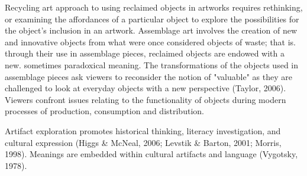 Recycling art approach to using reclaimed objects in artworks requires rethinking, or examining the affordances of a particular object to explore the possibilities for the object's inclusion in an artwork. Assemblage art involves the creation of new and innovative objects from what were once considered objects of waste; that is. through their use in assemblage pieces, reclaimed objects are endowed with a new. sometimes paradoxical meaning. The transformations of the objects used in assemblage pieces ask viewers to reconsider the notion of "valuable" as they are challenged to look at everyday objects with a new perspective (Taylor, 2006). Viewers confront issues relating to the functionality of objects during modern processes of production, consumption and distribution.

Artifact exploration promotes historical thinking, literacy investigation, and cultural expression (Higgs \& McNeal, 2006; Levstik \& Barton, 2001; Morris, 1998). Meanings are embedded within cultural artifacts and language (Vygotsky, 1978).

